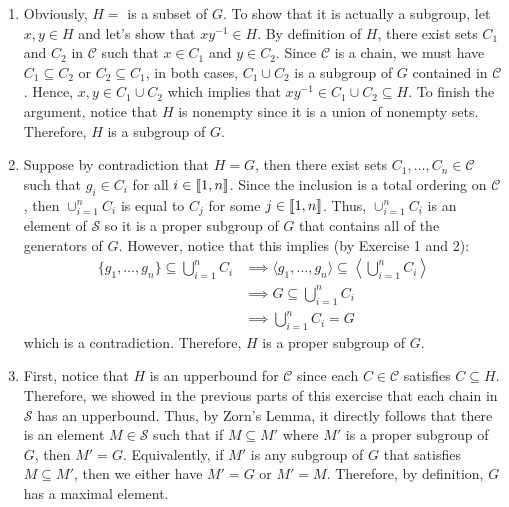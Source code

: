 \begin{solution}
    \begin{enumerate}[label = \textbf{(\alph*)}]
        \item Obviously, $H = $ is a subset of $G$. To show that it is actually a subgroup, let $x,y \in H$ and let's show that $xy^{-1} \in H$. By definition of $H$, there exist sets $C_1$ and $C_2$ in $\mathcal{C}$ such that $x \in C_1$ and $y \in C_2$. Since $\mathcal{C}$ is a chain, we must have $C_1 \subseteq C_2$ or $C_2 \subseteq C_1$, in both cases, $C_1 \cup C_2$ is a subgroup of $G$ contained in $\mathcal{C}$. Hence, $x,y \in C_1 \cup C_2$ which implies that $xy^{-1} \in C_1 \cup C_2 \subseteq H$. To finish the argument, notice that $H$ is nonempty since it is a union of nonempty sets. Therefore, $H$ is a subgroup of $G$.
        \item Suppose by contradiction that $H = G$, then there exist sets $C_1, \dots, C_n \in \mathcal{C}$ such that $g_i \in C_i$ for all $i \in \llbracket 1 , n \rrbracket$. Since the inclusion is a total ordering on $\mathcal{C}$, then $\cup_{i=1}^nC_i$ is equal to $C_j$ for some $j \in \llbracket 1 , n \rrbracket$. Thus, $\cup_{i=1}^nC_i$ is an element of $\mathcal{S}$ so it is a proper subgroup of $G$ that contains all of the generators of $G$. However, notice that this implies (by Exercise 1 and 2):
        \begin{align*}
            \{g_1,\dots,g_n\} \subseteq \bigcup_{i=1}^nC_i &\implies \langle g_1,\dots,g_n \rangle \subseteq \left< \bigcup_{i=1}^nC_i \right> \\
            &\implies G \subseteq \bigcup_{i=1}^nC_i \\
            &\implies \bigcup_{i=1}^nC_i = G
        \end{align*}
        which is a contradiction. Therefore, $H$ is a proper subgroup of $G$.
        \item First, notice that $H$ is an upperbound for $\mathcal{C}$ since each $C \in \mathcal{C}$ satisfies $C \subseteq H$. Therefore, we showed in the previous parts of this exercise that each chain in $\mathcal{S}$ has an upperbound. Thus, by Zorn's Lemma, it directly follows that there is an element $M \in \mathcal{S}$ such that if $M \subseteq M'$ where $M'$ is a proper subgroup of $G$, then $M' = G$. Equivalently, if $M'$ is any subgroup of $G$ that satisfies $M \subseteq M'$, then we either have $M' = G$ or $M' = M$. Therefore, by definition, $G$ has a maximal element. \\
    \end{enumerate}
\end{solution}

